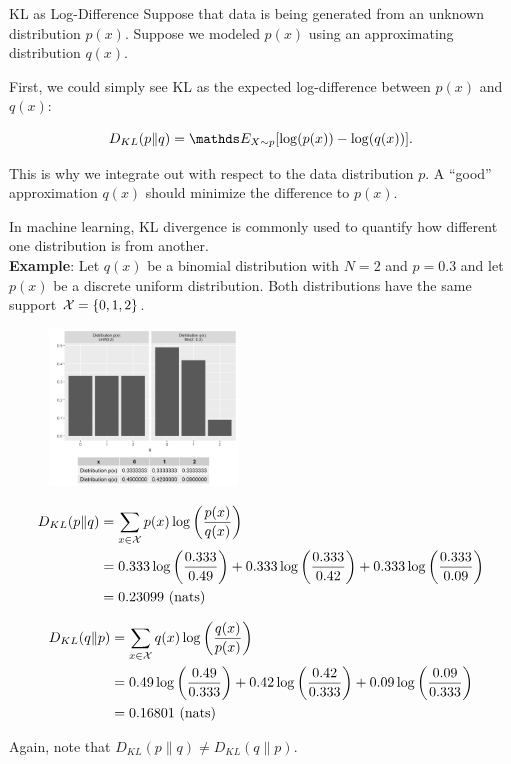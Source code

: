 \documentclass[11pt,compress,t,notes=noshow, xcolor=table]{beamer}
\begin{document}
\begin{vbframe} {KL as Log-Difference}
Suppose that data is being generated from an unknown distribution $p(x)$. 
Suppose we modeled $p(x)$ using an approximating distribution $q(x)$. 

\lz

First, we could simply see KL as the expected log-difference between $p(x)$ and $q(x)$:

  $$ D_{KL}(p \| q) = \E_{X \sim p}[\log(p(x)) - \log(q(x))].$$

This is why we integrate out with respect to the data distribution $p$.
A \enquote{good} approximation $q(x)$ should minimize the difference to $p(x)$.

\framebreak

In machine learning, KL divergence is commonly used to quantify how different one distribution is from another.\\
\lz
\textbf{Example}:
Let $q(x)$ be a binomial distribution with $N = 2$ and $p = 0.3$ and let $p(x)$ be a discrete uniform distribution. Both distributions have the same support $\mathcal{X} = \{0, 1, 2\}$.

\begin{figure}
\includegraphics[width = 5cm ]{figure/kl_log_diff_plot.png} 
\end{figure}

\framebreak

\begin{equation*}
  \begin{split}
 D_{KL}(p \| q) &= \sum_{x \in \mathcal{X}} p(x) \log \left( \frac{p(x)}{q(x)} \right)
 \\ &= 0.333 \log \left( \frac{0.333}{0.49} \right) + 0.333 \log \left( \frac{0.333}{0.42} \right) + 0.333 \log \left( \frac{0.333}{0.09} \right) \\ &= 0.23099 \text{    (nats)}
  \end{split}
\end{equation*}

\begin{equation*}
  \begin{split}
 D_{KL}(q \| p) &= \sum_{x \in \mathcal{X}} q(x) \log \left( \frac{q(x)}{p(x)} \right)
 \\ &= 0.49 \log \left( \frac{0.49}{0.333} \right) + 0.42 \log \left( \frac{0.42}{0.333} \right) + 0.09 \log \left( \frac{0.09}{0.333} \right) \\ &= 0.16801 \text{    (nats)}
  \end{split}
\end{equation*}

Again, note that $D_{KL}(p \| q) \neq D_{KL}(q \| p)$.
\end{vbframe}
\end{document}
